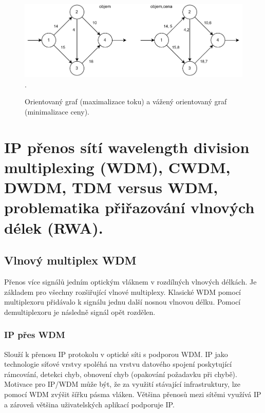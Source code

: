 \begin{figure}[ht]
    \centering
    \includegraphics[width=\textwidth]{snimky/ilp}.
    \caption{Orientovaný graf (maximalizace toku) a vážený orientovaný graf (minimalizace ceny).}
\end{figure}


\clearpage
\section{IP přenos sítí wavelength division multiplexing (WDM), CWDM, DWDM, TDM versus WDM, problematika přiřazování vlnových délek (RWA).}

\subsection{Vlnový multiplex WDM}

Přenos více signálů jedním optickým vláknem v rozdílných vlnových délkách. Je základem pro všechny rozšiřující vlnové multiplexy. Klasické WDM pomocí multiplexoru přidávalo k signálu jednu další nosnou vlnovou délku. Pomocí demultiplexoru je následně signál opět rozdělen.

\subsubsection{IP přes WDM}

Slouží k přenosu IP protokolu v optické síti s podporou WDM. IP jako technologie síťové vrstvy spoléhá na vrstvu datového spojení poskytující rámcování, detekci chyb, obnovení chyb (opakování požadavku při chybě). Motivace pro IP/WDM může být, že za využití stávající infrastruktury, lze pomocí WDM zvýšit šířku pásma vláken. Většina přenosů mezi sítěmi využívá IP a zároveň většina uživatelských aplikací podporuje IP.

